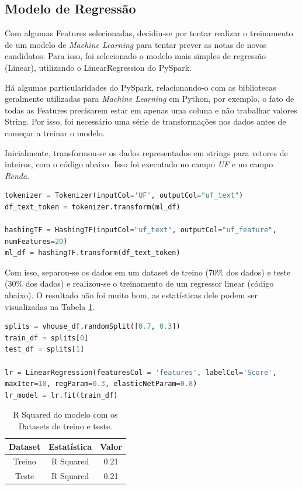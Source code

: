 \documentclass{article}
\begin{document}
\subsection{Modelo de Regressão}

Com algumas Features selecionadas, decidiu-se por tentar realizar o treinamento de um modelo de \emph{Machine Learning} para tentar prever as notas de novos candidatos. Para isso, foi selecionado o modelo mais simples de regressão (Linear), utilizando o LinearRegression do PySpark.

Há algumas particularidades do PySpark, relacionando-o com as bibliotecas geralmente utilizadas para \emph{Machine Learning} em Python, por exemplo, o fato de todas as Features precisarem estar em apenas uma coluna e não trabalhar valores String. Por isso, foi necessário uma série de transformações nos dados antes de começar a treinar o modelo.

Inicialmente, transformou-se os dados representados em strings para vetores de inteiros, com o código abaixo.
Isso foi executado no campo \emph{UF} e no campo \emph{Renda}.

\begin{lstlisting}[caption= {Transformação de dados String.},captionpos=b, language=python]
tokenizer = Tokenizer(inputCol='UF', outputCol="uf_text")
df_text_token = tokenizer.transform(ml_df)

hashingTF = HashingTF(inputCol="uf_text", outputCol="uf_feature",
numFeatures=20)
ml_df = hashingTF.transform(df_text_token)
\end{lstlisting}

Com isso, separou-se os dados em um dataset de treino (70\% dos dados) e teste (30\% dos dados) e realizou-se o treinamento de um regressor linear (código abaixo). O resultado não foi muito bom, as estatísticas dele podem ser visualizadas na Tabela \ref{tab:model_traign}.


\begin{lstlisting}[caption= {Treinamento de modelo de Regressão Linear.},captionpos=b, language=python]
splits = vhouse_df.randomSplit([0.7, 0.3])
train_df = splits[0]
test_df = splits[1]

lr = LinearRegression(featuresCol = 'features', labelCol='Score',
maxIter=10, regParam=0.3, elasticNetParam=0.8)
lr_model = lr.fit(train_df)
\end{lstlisting}

\begin{table}[H]
\centering
\begin{tabular}{|c|c|c|}
\hline
Dataset & Estatística & Valor \\ \hline \hline
Treino & R Squared & 0.21\\ \hline
Teste & R Squared & 0.21 \\ \hline
\end{tabular}
\caption{R Squared do modelo com os Datasets de treino e teste.}
\label{tab:model_traign}
\end{table}
\end{document}
